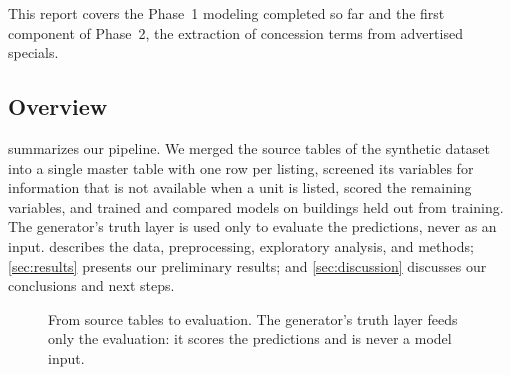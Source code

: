 This report covers the Phase~1 modeling completed so far and the first component of Phase~2, the extraction of concession terms from advertised
specials.

\subsection{Overview}

 summarizes our pipeline. We merged the source tables of the synthetic dataset
into a single master table with one row per listing, screened its variables for information that is
not available when a unit is listed, scored the remaining variables, and trained and compared models
on buildings held out from training. The generator's truth layer is used only to evaluate the
predictions, never as an input.   describes the data, preprocessing, exploratory
analysis, and methods; \cref{sec:results} presents our preliminary results; and
\cref{sec:discussion} discusses our conclusions and next steps.

\begin{figure}[htbp]
  \centering
  
  \caption{From source tables to evaluation. The generator's truth layer feeds only the evaluation:
  it scores the predictions and is never a model input.}
  \label{fig:pipeline}
\end{figure}
